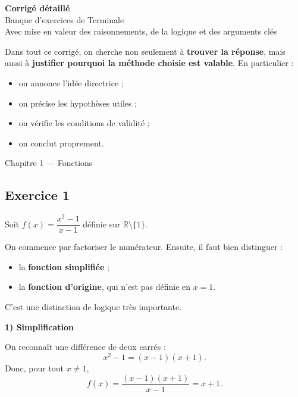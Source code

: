 \documentclass[11pt,a4paper]{article}
\newcommand{\R}{\mathbb{R}}
\begin{document}
\begin{center}
    {\LARGE \textbf{Corrigé détaillé}}\\[0.4em]
    {\large Banque d'exercices de Terminale}\\[0.3em]
    {\normalsize Avec mise en valeur des raisonnements, de la logique et des arguments clés}
\end{center}

\vspace{0.7em}

\begin{methodebox}
Dans tout ce corrigé, on cherche non seulement à \textbf{trouver la réponse}, mais aussi à \textbf{justifier pourquoi la méthode choisie est valable}.  
En particulier :
\begin{itemize}
    \item on annonce l'idée directrice ;
    \item on précise les hypothèses utiles ;
    \item on vérifie les conditions de validité ;
    \item on conclut proprement.
\end{itemize}
\end{methodebox}

\begin{chapitrebox}{Chapitre 1 --- Fonctions}
\end{chapitrebox}

\subsection*{Exercice 1}
Soit \(f(x)=\dfrac{x^2-1}{x-1}\) définie sur \(\R\setminus\{1\}\).

\begin{methodebox}
On commence par factoriser le numérateur.  
Ensuite, il faut bien distinguer :
\begin{itemize}
    \item la \textbf{fonction simplifiée} ;
    \item la \textbf{fonction d'origine}, qui n'est pas définie en \(x=1\).
\end{itemize}
C'est une distinction de logique très importante.
\end{methodebox}

\textbf{1) Simplification}

On reconnaît une différence de deux carrés :
\[
x^2-1=(x-1)(x+1).
\]
Donc, pour tout \(x\neq 1\),
\[
f(x)=\frac{(x-1)(x+1)}{x-1}=x+1.
\]
\end{document}
